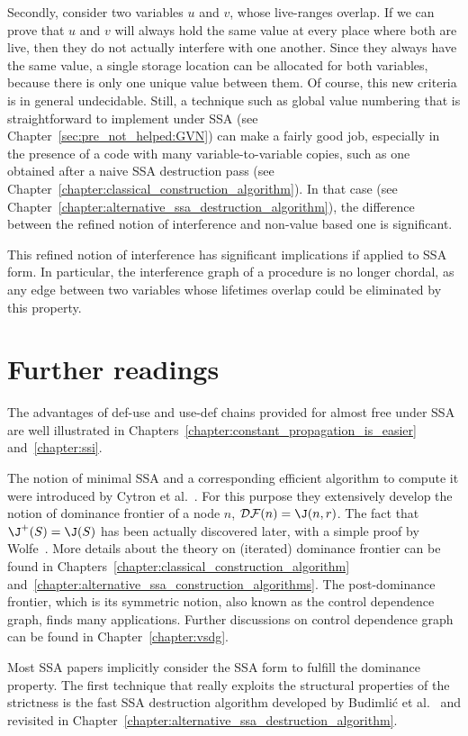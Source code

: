 Secondly, consider two variables $u$ and $v$, whose live-ranges overlap.
If we can prove that $u$ and $v$ will always hold the same value
at every place where both are live, then they do not actually interfere
with one another. Since they always have the same value, a single 
storage location can be allocated for both variables, because there
is only one unique value between them. 
Of course, this new criteria is in general undecidable.
Still, a technique such as global value numbering that is straightforward to implement under SSA (see Chapter~\ref{sec:pre_not_helped:GVN}) can make a fairly good job, especially in the presence of a code with many variable-to-variable copies, such as one obtained after a naive 
SSA destruction pass (see Chapter~\ref{chapter:classical_construction_algorithm}).
In that case (see Chapter~\ref{chapter:alternative_ssa_destruction_algorithm}), the difference between the refined notion of interference and non-value based one is significant. 

This refined notion of interference has significant implications if
applied to SSA form. In particular, the interference graph of a procedure
is no longer chordal, as any edge between two variables whose lifetimes
overlap could be eliminated by this property. 


\section{Further readings}
The advantages of def-use and use-def chains provided for almost free under SSA are well illustrated in Chapters~\ref{chapter:constant_propagation_is_easier} and~\ref{chapter:ssi}.

The notion of minimal SSA and a corresponding efficient algorithm to compute it were introduced by Cytron et al.~\cite{CytronOct91}. For this purpose they extensively develop the notion of dominance frontier of a node $n$, ${\cal DF}(n)=\J(n,r)$. The fact that $\J^+(S)=\J(S)$ has been actually discovered later, with a simple proof by Wolfe~\cite{WolfeJul94}. More details about the theory on (iterated) dominance frontier can be found in Chapters~\ref{chapter:classical_construction_algorithm} and~\ref{chapter:alternative_ssa_construction_algorithms}. The post-dominance frontier, which is its symmetric notion, also known as the control dependence graph, finds many applications. Further discussions on control dependence graph can be found in Chapter~\ref{chapter:vsdg}. 

Most SSA papers implicitly consider the SSA form to fulfill the dominance property. The first technique that really exploits the structural properties of the strictness is the fast SSA destruction algorithm developed by Budimli\'c et al.~\cite{BudimlicJun02} and revisited in Chapter~\ref{chapter:alternative_ssa_destruction_algorithm}. 

